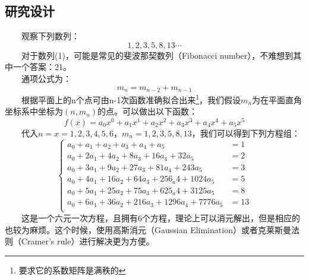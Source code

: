 \documentclass[12pt]{article}
\begin{document}
      \subsection{研究设计}
        　　观察下列数列：
        \begin{equation}
          1, 2, 3, 5, 8, 13\cdots
        \end{equation}
        　　对于数列(1)，可能是常见的斐波那契数列（Fibonacci number），不难想到其中一个答案：21。\\
        　　通项公式为：
        \begin{equation}
          m_{n}=m_{n-2}+m_{n-1}
        \end{equation}
        　　根据平面上的n个点可由n-1次函数准确拟合出来\footnote{要求它的系数矩阵是满秩的}，我们假设$m_{n}$为在平面直角坐标系中坐标为$(n,m_{n})$的点。可以做出以下函数：
        \begin{equation}
          f(x)=a_{0}x^{0}+a_{1}x^{1}+a_{2}x^{2}+a_{3}x^{3}+a_{4}x^{4}+a_{5}x^{5}
        \end{equation}
        　　代入$n=x=1,2,3,4,5,6$，$m_{n}=1,2,3,5,8,13$，我们可以得到下列方程组：
        \begin{equation}
          \left\{
            \begin{aligned}
              a_{0}+a_{1}+a_{2}+a_{3}+a_{4}+a_{5}&=1\\
              a_{0}+2a_{1}+4a_{2}+8a_{3}+16a_{4}+32a_{5}&=2\\
              a_{0}+3a_{1}+9a_{2}+27a_{3}+81a_{4}+243a_{5}&=3\\
              a_{0}+4a_{1}+16a_{2}+64a_{3}+256_a{4}+1024a_{5}&=5\\
              a_{0}+5a_{1}+25a_{2}+75a_{3}+625_a{4}+3125a_{5}&=8\\
              a_{0}+6a_{1}+36a_{2}+216a_{3}+1296a_{4}+7776a_{5}&=13\\
            \end{aligned}
          \right.
        \end{equation}
        　　这是一个六元一次方程，且拥有6个方程，理论上可以消元解出，但是相应的也较为麻烦。这个时候，使用高斯消元（Gaussian Elimination）或者克莱斯曼法则（Cramer's rule）进行解决更为方便。
\end{document}
